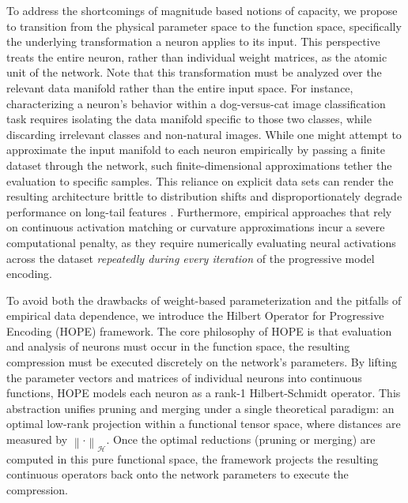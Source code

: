 \documentclass[11pt, a4paper, copyright, gdm]{google}
\newcommand{\norm}[1]{\left\lVert#1\right\rVert}
\newcommand{\calH}{\mathcal{H}}
\theoremstyle{definition}
\begin{document}
To address the shortcomings of magnitude based notions of capacity, we propose to transition from the physical parameter space to the function space, specifically the underlying transformation a neuron applies to its input. This perspective treats the entire neuron, rather than individual weight matrices, as the atomic unit of the network. Note that this transformation must be analyzed over the relevant data manifold rather than the entire input space. For instance, characterizing a neuron's behavior within a dog-versus-cat image classification task requires isolating the data manifold specific to those two classes, while discarding irrelevant classes and non-natural images. While one might attempt to approximate the input manifold to each neuron empirically by passing a finite dataset through the network, such finite-dimensional approximations tether the evaluation to specific samples. This reliance on explicit data sets can render the resulting architecture brittle to distribution shifts and disproportionately degrade performance on long-tail features \cite{hooker2019what}. Furthermore, empirical approaches that rely on continuous activation matching or curvature approximations \cite{molchanov2016pruning, luo2017thinet} incur a severe computational penalty, as they require numerically evaluating neural activations across the dataset \textit{repeatedly during every iteration} of the progressive model encoding.

To avoid both the drawbacks of weight-based parameterization and the pitfalls of empirical data dependence, we introduce the Hilbert Operator for Progressive Encoding (HOPE) framework. The core philosophy of HOPE is that evaluation and analysis of neurons must occur in the function space, the resulting compression must be executed discretely on the network's parameters. By lifting the parameter vectors and matrices of individual neurons into continuous functions, HOPE models each neuron as a rank-1 Hilbert-Schmidt operator. This abstraction unifies pruning and merging under a single theoretical paradigm: an optimal low-rank projection within a functional tensor space, where distances are measured by $\norm{ \cdot}_{\calH}$. Once the optimal reductions (pruning or merging) are computed in this pure functional space, the framework projects the resulting continuous operators back onto the network parameters to execute the compression.
\end{document}
